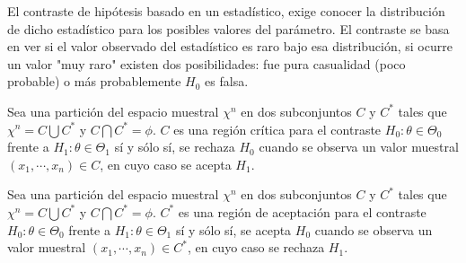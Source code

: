 
\begin{observación}
    El contraste de hipótesis basado en un estadístico, exige conocer la distribución de dicho estadístico para los posibles valores del parámetro. El contraste se basa en ver si el valor observado del estadístico es raro bajo esa distribución, si ocurre un valor "muy raro" existen dos posibilidades: fue pura casualidad (poco probable) o más probablemente $H_0$ es falsa. 
\end{observación}

\begin{definición} 
    Sea una partición del espacio muestral $\chi^{n}$ en dos subconjuntos $C$ y $C^{*}$ tales que $\chi^{n}=C \bigcup C^{*}$ y $C \bigcap C^{*}=\phi$. $C$ es una región crítica para el contraste $H_{0}: \theta \in \Theta_{0}$ frente a $H_{1}: \theta \in \Theta_{1}$ sí y sólo sí, se rechaza $H_{0}$ cuando se observa un valor muestral $\left(x_{1}, \cdots, x_{n}\right) \in C$, en cuyo caso se acepta $H_{1}$. 
\end{definición}

\begin{definición} 
    Sea una partición del espacio muestral $\chi^{n}$ en dos subconjuntos $C$ y $C^{*}$ tales que $\chi^{n}=C \bigcup C^{*}$ y $C \bigcap C^{*}=\phi$. $C^{*}$ es una región de aceptación para el contraste $H_{0}: \theta \in \Theta_{0}$ frente a $H_{1}: \theta \in \Theta_{1}$ sí y sólo sí, se acepta $H_{0}$ cuando se observa un valor muestral $\left(x_{1}, \cdots, x_{n}\right) \in C^{*}$, en cuyo caso se rechaza $H_{1}$. 
\end{definición}


